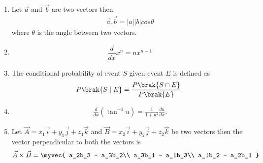 \begin{enumerate}[label=\thesubsection.\arabic*, ref=\thesubsection.\theenumi]
\begin{align}
A &= \int_a^b \sbrak{f\brak{x}-g\brak{x}}\,dx
\end{align}

In general,

\begin{align}
A &= \int_a^b \abs{f\brak{x}-g\brak{x}}\,dx
\end{align}

Area with respect to $y$, for the curve $x=f\brak{y}$ and the $y$-axis,

\begin{align}
A &= \int_c^d \abs{f\brak{y}}\,dy
\end{align}

Area between two curves with respect to $y$,

\begin{align}
A &= \int_c^d
\sbrak{x_{\text{right}}\brak{y}-x_{\text{left}}\brak{y}}\,dy
\end{align}

\item 
Let $\vec{a}$ and $\vec{b}$ are two vectors then 
\begin{align}
\vec{a}.\vec{b} = |a||b|cos\theta
\label{eq:EE26BTECH11211-Prob_7.1}
\end{align}
where $\theta$ is the angle between two vectors.

\item
\begin{align}
\dfrac{d}{dx}x^n = nx^{n-1}
\end{align}

\item
The conditional probability of event $S$ given event $E$
is defined as
\begin{align}
P\brak{S\mid E}=\frac{P\brak{S\cap E}}{P\brak{E}}.
\label{eq:EE26BTECH11211-Prob_9.1}
\end{align}

\item
\begin{align}
\frac{d}{dx}\left(\tan^{-1}u\right)
= \frac{1}{1+u^2}\frac{du}{dx}.
\label{eq:EE26BTECH11211_Prob_10.1}
\end{align}

\item
Let $\vec{A} = x_1\vec{i} + y_1\vec{j} + z_1\vec{k}$ and $\vec{B}= x_2\vec{i} + y_2\vec{j} + z_2\vec{k}$ be two vectors then the vector perpendicular to both the vectors is 
\begin{align}
\vec{A}\times\vec{B}
=
\myvec{
a_2b_3 - a_3b_2\\
a_3b_1 - a_1b_3\\
a_1b_2 - a_2b_1
}\label{eq:EE26BTECH11211_Prob_11.1}
\end{align}


\end{enumerate}
